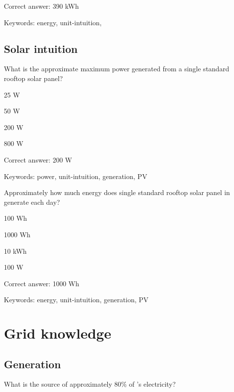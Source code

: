 Correct answer: 390 kWh

Keywords: energy, unit-intuition, \Hawaii 

\subsection{Solar intuition}

\begin{question}
	\item What is the approximate maximum power generated from a single standard rooftop solar panel?
\end{question}

\begin{answer}
	\item 25 W
	\item 50 W
	\item 200 W
	\item 800 W
\end{answer}

Correct answer: 200 W

Keywords: power, unit-intuition, generation, PV

\begin{question}
	\item Approximately how much energy does single standard rooftop solar panel in \Hawaii generate each day?
\end{question}

\begin{answer}
	\item 100 Wh
	\item 1000 Wh
	\item 10 kWh
	\item 100 W
\end{answer}

Correct answer: 1000 Wh

Keywords: energy, unit-intuition, generation, PV


\section{Grid knowledge}

\subsection{Generation}

\begin{question}
	\item What is the source of approximately 80\% of \Hawaii's electricity?
\end{question}

